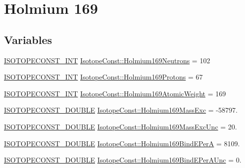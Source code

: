 \hypertarget{group___isotope_const-_holmium-_ho169}{}\section{Holmium 169}
\label{group___isotope_const-_holmium-_ho169}
\subsection*{Variables}
\begin{DoxyCompactItemize}
\item 
\mbox{\hyperlink{group___isotope_const-_macros_ga5f18360b3e99483a35c32d789e62621c}{I\+S\+O\+T\+O\+P\+E\+C\+O\+N\+S\+T\+\_\+\+I\+NT}} \mbox{\hyperlink{group___isotope_const-_holmium-_ho169_ga0b76776d3480a4440ce12cb0b65c6b0c}{Isotope\+Const\+::\+Holmium169\+Neutrons}} = 102
\item 
\mbox{\hyperlink{group___isotope_const-_macros_ga5f18360b3e99483a35c32d789e62621c}{I\+S\+O\+T\+O\+P\+E\+C\+O\+N\+S\+T\+\_\+\+I\+NT}} \mbox{\hyperlink{group___isotope_const-_holmium-_ho169_ga795061f45ccce3eb5389e0ea7ff6410b}{Isotope\+Const\+::\+Holmium169\+Protons}} = 67
\item 
\mbox{\hyperlink{group___isotope_const-_macros_ga5f18360b3e99483a35c32d789e62621c}{I\+S\+O\+T\+O\+P\+E\+C\+O\+N\+S\+T\+\_\+\+I\+NT}} \mbox{\hyperlink{group___isotope_const-_holmium-_ho169_ga26cff4264393f4cc5f7cdbe940f15487}{Isotope\+Const\+::\+Holmium169\+Atomic\+Weight}} = 169
\item 
\mbox{\hyperlink{group___isotope_const-_macros_ga8f45a7272ce02c0b4c65c44636ed719a}{I\+S\+O\+T\+O\+P\+E\+C\+O\+N\+S\+T\+\_\+\+D\+O\+U\+B\+LE}} \mbox{\hyperlink{group___isotope_const-_holmium-_ho169_gaa340b5b6aa8e81d8b1c5e652e0fc1491}{Isotope\+Const\+::\+Holmium169\+Mass\+Exc}} = -\/58797.
\item 
\mbox{\hyperlink{group___isotope_const-_macros_ga8f45a7272ce02c0b4c65c44636ed719a}{I\+S\+O\+T\+O\+P\+E\+C\+O\+N\+S\+T\+\_\+\+D\+O\+U\+B\+LE}} \mbox{\hyperlink{group___isotope_const-_holmium-_ho169_gaf1645f8208c6405e1dffa69fa501bab4}{Isotope\+Const\+::\+Holmium169\+Mass\+Exc\+Unc}} = 20.
\item 
\mbox{\hyperlink{group___isotope_const-_macros_ga8f45a7272ce02c0b4c65c44636ed719a}{I\+S\+O\+T\+O\+P\+E\+C\+O\+N\+S\+T\+\_\+\+D\+O\+U\+B\+LE}} \mbox{\hyperlink{group___isotope_const-_holmium-_ho169_gaa0c7b38899905ca2179a23be0841a87a}{Isotope\+Const\+::\+Holmium169\+Bind\+E\+PerA}} = 8109.
\item 
\mbox{\hyperlink{group___isotope_const-_macros_ga8f45a7272ce02c0b4c65c44636ed719a}{I\+S\+O\+T\+O\+P\+E\+C\+O\+N\+S\+T\+\_\+\+D\+O\+U\+B\+LE}} \mbox{\hyperlink{group___isotope_const-_holmium-_ho169_ga63496f1652a0512b657944ca7f4c71ff}{Isotope\+Const\+::\+Holmium169\+Bind\+E\+Per\+A\+Unc}} = 0.

\end{DoxyCompactItemize}
